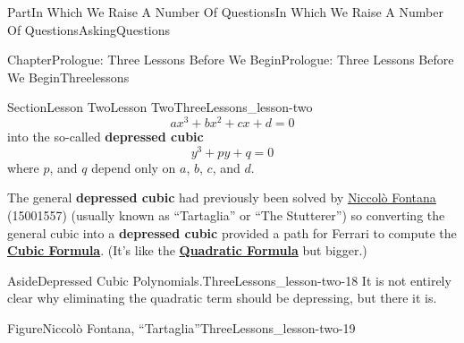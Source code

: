 \documentclass[oneside,10pt,]{book}
\newcommand{\terminology}[1]{\textbf{#1}}
\numberwithin{equation}{part}
\begin{document}
\begin{partptx}{Part}{In Which We Raise A Number Of Questions}{}{In Which We Raise A Number Of Questions}{}{}{AskingQuestions}
\begin{chapterptx}{Chapter}{Prologue: Three Lessons Before We Begin}{}{Prologue: Three Lessons Before We Begin}{}{}{Threelessons}
\begin{sectionptx}{Section}{Lesson Two}{}{Lesson Two}{}{}{ThreeLessons_lesson-two}
\begin{equation}
ax^3+bx^2+cx+d=0\label{eq_GenCubic}
\end{equation}
into the so-called \terminology{depressed cubic}%
\begin{equation*}
y^3 +py+q=0
\end{equation*}
where \(p\), and \(q\) depend only on \(a\), \(b\), \(c\), and \(d\).%
\par
The general \terminology{depressed cubic} had previously been solved by \href{https://mathshistory.st-andrews.ac.uk/Biographies/Tartaglia/}{Niccolò Fontana} (1500\textendash{}1557) (usually known as ``Tartaglia'' or ``The Stutterer'') so converting the general cubic into a \terminology{depressed cubic} provided a path for Ferrari to compute the \href{https://mathshistory.st-andrews.ac.uk/HistTopics/Quadratic_etc_equations/}{\terminology{Cubic Formula}}. (It's like the \terminology{\hyperref[EQUATIONQuadraticFormula]{Quadratic Formula}} but bigger.)%
\begin{aside}{Aside}{Depressed Cubic Polynomials.}{ThreeLessons_lesson-two-18}%
It is not entirely clear why eliminating the quadratic term should be depressing, but there it is.%
\end{aside}
\begin{figureptx}{Figure}{Niccolò Fontana, ``Tartaglia''}{ThreeLessons_lesson-two-19}{}%
%
%
\begin{image}{0.325}{0.35}{0.325}{}%

\end{image}
\end{figureptx}
\end{sectionptx}
\end{chapterptx}
\end{partptx}
\end{document}
